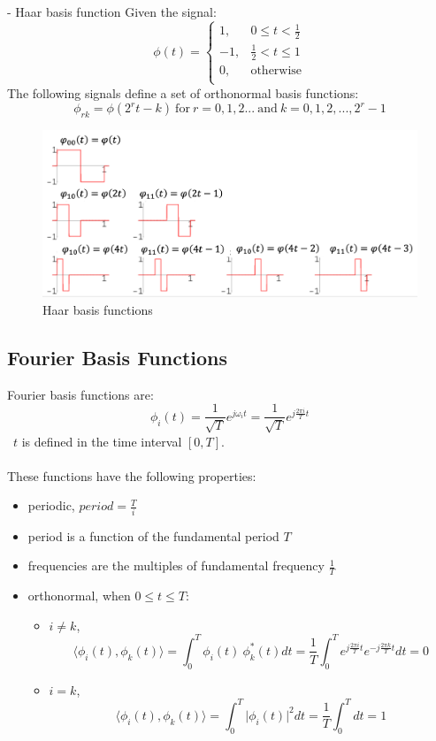 \begin{ex}{- Haar basis function}
Given the signal:
\[ \phi(t)=\begin{cases}
1, & 0 \leq t < \frac{1}{2}\\
-1, & \frac{1}{2} < t \leq 1\\
0, &\text{otherwise}\\
\end{cases} \]
The following signals define a set of orthonormal basis functions:
\[ \phi_{rk} = \phi(2^{r}t-k) \ \text{for} \ r=0,1,2... \ \text{and} \ k=0,1,2,...,2^{r}-1 \]
 \begin{figure}[H]\centering
 \includegraphics[width = \textwidth]{images/haar}
 \caption{Haar basis functions} \end{figure}
\end{ex}
\subsection{Fourier Basis Functions}

Fourier basis functions are:
\[ \phi_{i}(t) = \frac{1}{\sqrt{T}} e^{j\omega_{i} t} =  \frac{1}{\sqrt{T}} e^{j\frac{2\pi i}{T} t} \]
\ $t$ is defined in the time interval $[0,T]$.\\\\
These functions have the following properties:
\begin{itemize}
 \item periodic, $period = \frac{T}{i}$
 \item period is a function of the fundamental period $T$
 \item frequencies are the multiples of fundamental frequency $\frac{1}{T}$
 \item orthonormal, when $0 \leq t \leq T$:
 \begin{itemize}
   \item $i \neq k$,  \[ \langle \phi_{i}(t), \phi_{k}(t) \rangle = \int_{0}^{T}  \phi_{i}(t) \ \phi_{k}^{*}(t) dt = \frac{1}{T} \int_{0}^{T} e^{j\frac{2\pi i}{T} t}e^{-j\frac{2\pi k}{T} t} dt = 0\]
   \item $i=k$, \[ \langle \phi_{i}(t), \phi_{k}(t) \rangle  = \int_{0}^{T} \lvert \phi_{i}(t) \rvert^{2}dt = \frac{1}{T} \int_{0}^{T}dt =1\]
\end{itemize} \end{itemize}

